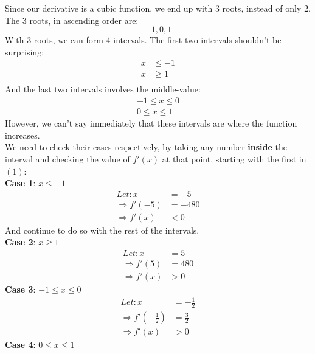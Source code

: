 \documentclass[hidelinks, a4paper, 12pt]{article}
\newcommand{\bd}{\textbf}
\newcommand{\n}{\\[\baselineskip]}
\newcommand{\thus}{\Rightarrow}
\begin{document}
                Since our derivative is a cubic function, we end up with 3 roots, instead of only 2. The 3 roots, in ascending order are:
                \[-1, 0, 1\]
                With 3 roots, we can form 4 intervals. The first two intervals shouldn't be surprising:
                \begin{equation}
                    \begin{aligned}
                        x &\leq -1\\
                        x &\geq 1\\
                    \end{aligned}
                \end{equation}
                And the last two intervals involves the middle-value:
                \[\begin{split}
                    -1 \leq x \leq 0\\
                    0 \leq x \leq 1
                \end{split}\]
                However, we can't say immediately that these intervals are where the function increases.\n
                We need to check their cases respectively, by taking any number \bd{inside} the interval and checking the value of $f'(x)$ at that point, starting with the first in $(1)$:\n
                \bd{Case 1}: $x \leq -1$
                \[\begin{split}
                    Let: x &= -5\\
                    \thus f'(-5) &= -480\\
                    \thus f'(x) &< 0
                \end{split}\]
                And continue to do so with the rest of the intervals.\n
                \bd{Case 2}: $x \geq 1$
                \[\begin{split}
                    Let: x &= 5\\
                    \thus f'(5) &= 480\\
                    \thus f'(x) &> 0
                \end{split}\]
                \bd{Case 3}: $-1 \leq x \leq 0$
                \[\begin{split}
                    Let: x &= -\frac{1}{2}\\
                    \thus f'\left(-\frac{1}{2}\right) &= \frac{3}{2}\\
                    \thus f'(x) &> 0
                \end{split}\]
                \bd{Case 4}: $0 \leq x \leq 1$
\end{document}
